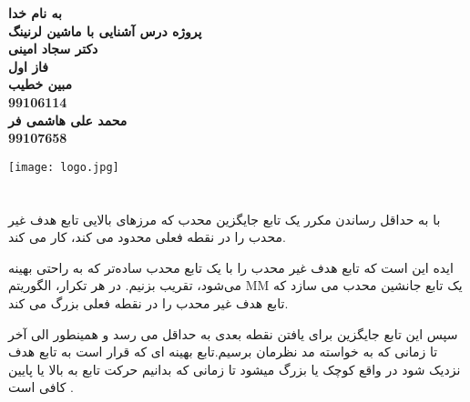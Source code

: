 

\begin{titlepage}
\begin{center}

\Huge
\textbf{به نام خدا}\\[2cm]

\huge
\textbf{ پروژه درس آشنایی با ماشین لرنینگ}\\[0.5cm]
\textbf{دکتر سجاد امینی}\\[1.5cm]
\textbf{فاز اول}\\[1.5cm]
\Large
\textbf{مبین خطیب}\\[0.3cm]
\textbf{99106114}\\[0.5cm]
\textbf{محمد علی هاشمی فر}\\[0.3cm]
\textbf{99107658}\\[0.5cm]






\begin{center}
\texttt{[image: logo.jpg]}
\end{center}
\end{center}
\end{titlepage}




\newpage
\huge
\raggedright \section{}
\large

\raggedright {}

\raggedleft
 با به حداقل رساندن مکرر یک تابع جایگزین محدب که مرزهای بالایی تابع هدف غیر محدب را در نقطه فعلی محدود می کند، کار می کند.

ایده این است که تابع هدف غیر محدب را با یک تابع محدب ساده‌تر که به راحتی بهینه می‌شود، تقریب بزنیم. در هر تکرار، الگوریتم MM یک تابع جانشین محدب می سازد که تابع هدف غیر محدب را در نقطه فعلی بزرگ می کند. 

سپس این تابع جایگزین برای یافتن نقطه بعدی به حداقل می رسد و همینطور الی آخر تا زمانی که به خواسته مد نظرمان برسیم.تابع بهینه ای که قرار است به تابع هدف نزدیک شود در واقع کوچک یا بزرگ میشود تا زمانی که بدانیم حرکت تابع به بالا یا پایین کافی است .


